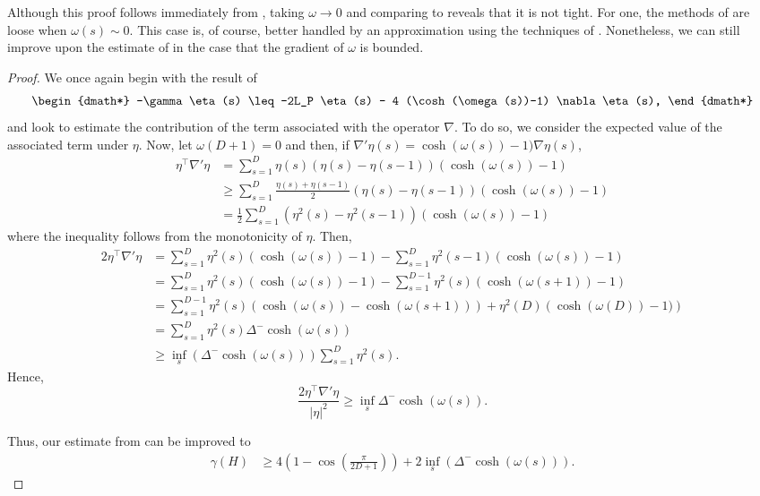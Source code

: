 Although this proof follows immediately from , taking $\omega \rightarrow 0$ and comparing to  reveals that it is not tight. For one, the methods of  are loose when $\omega(s)\sim 0$. This case is, of course, better handled by an approximation using the techniques of . Nonetheless, we can still improve upon the estimate of  in the case that the gradient of $\omega$ is bounded. 
\LCHarder*
\begin{proof}
	We once again begin with the result of 
	\begin{dgroup*}
	 	\begin{dmath*}
	 	-\gamma \eta(s) \leq -2L_P \eta(s) - 4 (\cosh(\omega(s))-1) \nabla \eta(s),
	 	\end{dmath*}
	 \end{dgroup*}
	 and look to estimate the contribution of the term associated with the operator $\nabla$. To do so, we consider the expected value of the associated term under $\eta$. Now, let $\omega(D+1)=0$ and then, if $\nabla'\eta(s)=\cosh(\omega(s))-1)\nabla\eta(s)$,
	 \begin{align*}
	 	\eta^{\top} \nabla' \eta &= \sum_{s=1}^{D} \eta(s)\left(\eta(s)-\eta(s-1)\right)(\cosh(\omega(s))-1) \\
	 	&\geq \sum_{s=1}^{D} \frac{\eta(s)+\eta(s-1)}{2}\left(\eta(s)-\eta(s-1)\right)(\cosh(\omega(s))-1) \\
	 	&=\frac{1}{2}\sum_{s=1}^{D}\left(\eta^2(s)-\eta^2(s-1)\right)(\cosh(\omega(s))-1)
	\end{align*}
	where the inequality follows from the monotonicity of $\eta$. Then,
	\begin{align*}	 	
	 	2 \eta^{\top} \nabla' \eta &=\sum_{s=1}^{D}\eta^2(s)(\cosh(\omega(s))-1) - \sum_{s=1}^{D}\eta^2(s-1)(\cosh(\omega(s))-1) \\
	 	&= \sum_{s=1}^{D}\eta^2(s)(\cosh(\omega(s))-1) - \sum_{s=1}^{D-1}\eta^2(s)(\cosh(\omega(s+1))-1) \\
	 	&= \sum_{s=1}^{D-1}\eta^2(s)(\cosh(\omega(s))-\cosh(\omega(s+1))) + \eta^2(D)\left(\cosh(\omega(D))-1)\right) \\
	 	&= \sum_{s=1}^{D}\eta^2(s)\Delta^- \cosh(\omega(s)) \\
	 	&\geq \inf_s\left(\Delta^- \cosh(\omega(s))\right)\sum_{s=1}^{D}\eta^2(s).
	 \end{align*}
	  Hence,
	\begin{equation*}
		\frac{2 \eta^{\top} \nabla' \eta}{\lvert \eta \rvert^2} \geq \inf_s \Delta^- \cosh \left( \omega(s)\right).
	\end{equation*}	 
	 
	 Thus, our estimate from  can be improved to
		\begin{align*}
			\gamma(H) &\geq 4\left(1-\cos\left(\frac{\pi}{2 D + 1}\right)\right) + 2\inf_s\left(\Delta^- \cosh(\omega(s))\right).
		\end{align*}
\end{proof}	